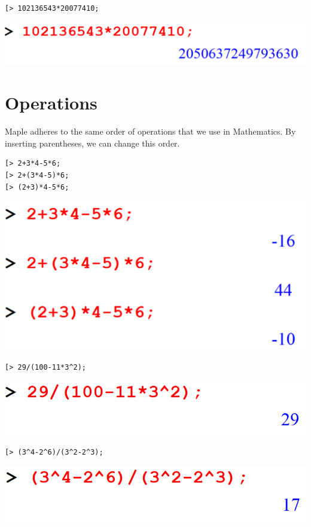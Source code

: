 \documentclass[
]{book}
\theoremstyle{definition}
\theoremstyle{definition}
\theoremstyle{definition}
\theoremstyle{definition}
\theoremstyle{remark}
\begin{document}
\begin{verbatim}
[> 102136543*20077410;
\end{verbatim}

\includegraphics{figures/Lesson 1/fig13.png}

\section{Operations}\label{operations}

Maple adheres to the same order of operations that we use in Mathematics. By inserting parentheses, we can change this order.

\begin{verbatim}
[> 2+3*4-5*6;
[> 2+(3*4-5)*6;
[> (2+3)*4-5*6;
\end{verbatim}

\includegraphics{figures/Lesson 1/fig14.png}

\begin{verbatim}
[> 29/(100-11*3^2);
\end{verbatim}

\includegraphics{figures/Lesson 1/fig15.png}

\begin{verbatim}
[> (3^4-2^6)/(3^2-2^3);
\end{verbatim}

\includegraphics{figures/Lesson 1/fig16.png}
\end{document}
